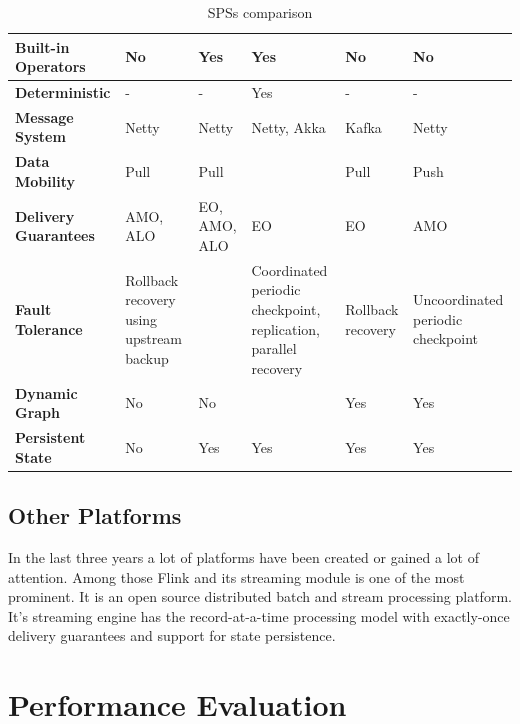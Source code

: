 \documentclass[ppgc,diss,english]{iiufrgs}
\begin{document}
\begin{table}[t]
\begin{center}
\begin{tabular}{ | p{2.5cm} | p{2cm} | p{2.5cm} | p{2.5cm} | p{2cm} | p{2cm} |}
        \textbf{Built-in Operators}      & No & Yes & Yes & No & No \\\hline
        \textbf{Deterministic}           & - & - & Yes & - & - \\\hline
        
        \textbf{Message System}          & Netty & Netty & Netty, Akka & Kafka & Netty \\\hline
        \textbf{Data Mobility}\cite{kamburugamuvesurvey}          & Pull & Pull &  & Pull & Push \\\hline
        \textbf{Delivery Guarantees}\cite{bockermann2014survey}    & AMO, ALO & EO, AMO, ALO & EO & EO & AMO \\\hline
        \textbf{Fault Tolerance}\cite{gradvohl2014comparing}         & Rollback recovery using upstream backup &  & Coordinated periodic checkpoint, replication, parallel recovery & Rollback recovery \cite{kamburugamuvesurvey}  & Uncoordinated periodic checkpoint \\\hline
        \textbf{Dynamic Graph}           & No & No &  & Yes & Yes \\\hline
        \textbf{Persistent State}        & No & Yes & Yes & Yes & Yes \\\hline
        
	\end{tabular}
	\begin{flushleft}
	\end{flushleft}
	\caption{SPSs comparison}
	\label{table:sps_comparison}
\end{center}
\end{table}

\subsection{Other Platforms}

In the last three years a lot of platforms have been created or gained a lot of attention. Among those Flink and its streaming module is one of the most prominent. It is an open source distributed batch and stream processing platform. It's streaming engine has the record-at-a-time processing model with exactly-once delivery guarantees and support for state persistence.



\section{Performance Evaluation}
\label{sec:esp:performance_evaluation}
\end{document}

